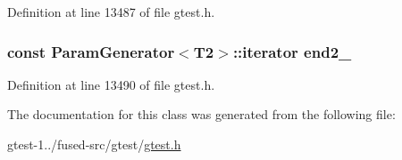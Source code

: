 \-Definition at line 13487 of file gtest.\-h.

\hypertarget{classtesting_1_1internal_1_1CartesianProductGenerator2_1_1Iterator_a5d6321f221328872abc05fee25994406}{
\subsubsection[{end2\-\_\-}]{\setlength{\rightskip}{0pt plus 5cm}const {\bf \-Param\-Generator}$<$\-T2$>$\-::iterator {\bf end2\-\_\-}}}\label{df/d16/classtesting_1_1internal_1_1CartesianProductGenerator2_1_1Iterator_a5d6321f221328872abc05fee25994406}


\-Definition at line 13490 of file gtest.\-h.



\-The documentation for this class was generated from the following file\-:\begin{DoxyCompactItemize}
\item 
gtest-\/1../fused-\/src/gtest/\hyperlink{fused-src_2gtest_2gtest_8h}{gtest.\-h}\end{DoxyCompactItemize}
